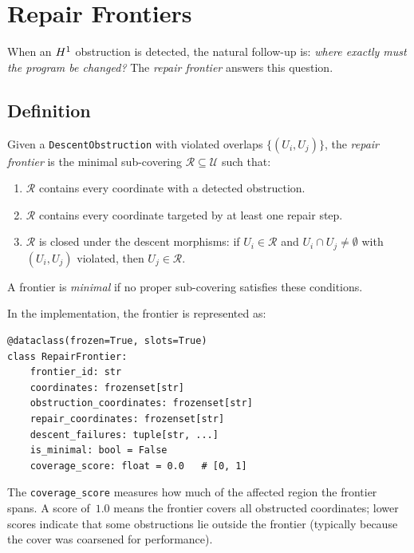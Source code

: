 \documentclass[11pt]{article}
\begin{document}
\section{Repair Frontiers}\label{sec:repair}

When an $H^{1}$ obstruction is detected, the natural follow-up is:
\emph{where exactly must the program be changed?}  The \emph{repair
frontier} answers this question.

\subsection{Definition}

\begin{definition}\label{def:repair-frontier}
Given a \texttt{DescentObstruction} with violated overlaps
$\{(U_i, U_j)\}$, the \emph{repair frontier} is the minimal sub-covering
$\mathcal{R} \subseteq \mathcal{U}$ such that:
\begin{enumerate}[label=(\roman*)]
\item $\mathcal{R}$ contains every coordinate with a detected obstruction.
\item $\mathcal{R}$ contains every coordinate targeted by at least one
  repair step.
\item $\mathcal{R}$ is closed under the descent morphisms: if $U_i \in
  \mathcal{R}$ and $U_i \cap U_j \neq \emptyset$ with $(U_i, U_j)$
  violated, then $U_j \in \mathcal{R}$.
\end{enumerate}
A frontier is \emph{minimal} if no proper sub-covering satisfies these
conditions.
\end{definition}

In the implementation, the frontier is represented as:

\begin{lstlisting}[caption={Repair frontier dataclass (simplified).},label={lst:repair-frontier}]
@dataclass(frozen=True, slots=True)
class RepairFrontier:
    frontier_id: str
    coordinates: frozenset[str]
    obstruction_coordinates: frozenset[str]
    repair_coordinates: frozenset[str]
    descent_failures: tuple[str, ...]
    is_minimal: bool = False
    coverage_score: float = 0.0   # [0, 1]
\end{lstlisting}

The \texttt{coverage\_score} measures how much of the affected region the
frontier spans.  A score of~$1.0$ means the frontier covers all obstructed
coordinates; lower scores indicate that some obstructions lie outside the
frontier (typically because the cover was coarsened for performance).
\end{document}
